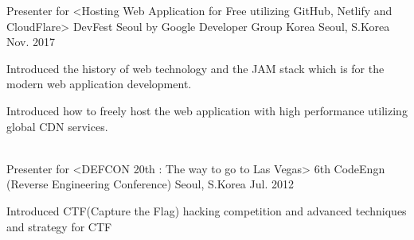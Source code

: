 

\begin{cventries}

  \cventry
    {Presenter for <Hosting Web Application for Free utilizing GitHub, Netlify and CloudFlare>} %
    {DevFest Seoul by Google Developer Group Korea} %
    {Seoul, S.Korea} %
    {Nov. 2017} %
    {
      \begin{cvitems} %
        \item {Introduced the history of web technology and the JAM stack which is for the modern web application development.}
        \item {Introduced how to freely host the web application with high performance utilizing global CDN services.}
      \end{cvitems}
    }

  \\

  \cventry
    {Presenter for <DEFCON 20th : The way to go to Las Vegas>} %
    {6th CodeEngn (Reverse Engineering Conference)} %
    {Seoul, S.Korea} %
    {Jul. 2012} %
    {
      \begin{cvitems} %
        \item {Introduced CTF(Capture the Flag) hacking competition and advanced techniques and strategy for CTF}
      \end{cvitems}
    }

\end{cventries}
